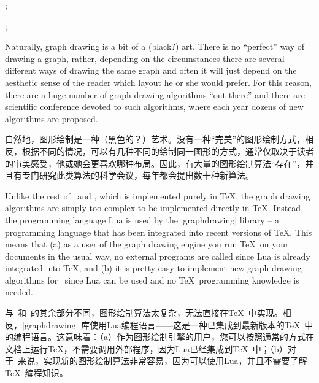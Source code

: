 \begin{codeexample}[preamble={\usetikzlibrary{graphs,graphdrawing}
\usegdlibrary{trees}}]
\tikz {};
\end{codeexample}

\begin{codeexample}[preamble={\usetikzlibrary{graphs,graphdrawing,quotes}
\usegdlibrary{force}}]
\tikz {};
\end{codeexample}

Naturally, graph drawing is a bit of a (black?) art. There is no ``perfect''
way of drawing a graph, rather, depending on the circumstances there are
several different ways of drawing the same graph and often it will just depend
on the aesthetic sense of the reader which layout he or she would prefer. For
this reason, there are a huge number of graph drawing algorithms ``out there''
and there are scientific conference devoted to such algorithms, where each year
dozens of new algorithms are proposed.

自然地，图形绘制是一种（黑色的？）艺术。没有一种“完美”的图形绘制方式，相反，根据不同的情况，可以有几种不同的绘制同一图形的方式，通常仅取决于读者的审美感受，他或她会更喜欢哪种布局。因此，有大量的图形绘制算法“存在”，并且有专门研究此类算法的科学会议，每年都会提出数十种新算法。

Unlike the rest of \pgfname\ and \tikzname, which is implemented purely in
\TeX, the graph drawing algorithms are simply too complex to be implemented
directly in \TeX. Instead, the programming language Lua is used by the
|graphdrawing| library -- a programming language that has been integrated into
recent versions of \TeX. This means that (a) as a user of the graph drawing
engine you run \TeX\ on your documents in the usual way, no external programs
are called since Lua is already integrated into \TeX, and (b) it is pretty easy
to implement new graph drawing algorithms for \tikzname\ since Lua can be used
and no \TeX\ programming knowledge is needed.

与\pgfname\ 和\tikzname\ 的其余部分不同，图形绘制算法太复杂，无法直接在\TeX\ 中实现。相反，|graphdrawing| 库使用Lua编程语言——这是一种已集成到最新版本的\TeX\ 中的编程语言。这意味着：（a）作为图形绘制引擎的用户，您可以按照通常的方式在文档上运行\TeX，不需要调用外部程序，因为Lua已经集成到\TeX\ 中；（b）对于\tikzname\ 来说，实现新的图形绘制算法非常容易，因为可以使用Lua，并且不需要了解\TeX\ 编程知识。


